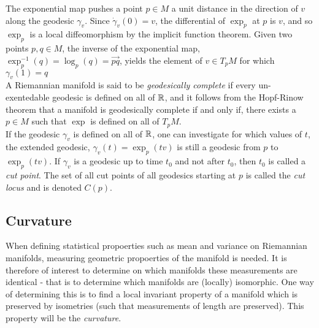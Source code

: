 The exponential map pushes a point $p \in M$ a unit distance in the direction of $v$ along the geodesic $\gamma_v$. Since $\dot{\gamma}_v(0) = v$, the differential of $\exp_p$ at $p$ is $v$, and so $\exp_p$ is a local diffeomorphism by the implicit function theorem. Given two points $p,q \in M$, the inverse of the exponential map, $\exp_p^{-1}(q) = \log_p(q) = \overrightarrow{pq}$, yields the element of $v \in T_p M$ for which $\gamma_v (1) = q$ \\[0.2 cm]
A Riemannian manifold is said to be \textit{geodesically complete} if every un-exentedable geodesic is defined on all of $\mathbb{R}$, and it follows from the Hopf-Rinow theorem that a manifold is geodesically complete if and only if, there exists a $p \in M$ such that $\exp$ is defined on all of $T_p M$.\\[0.2 cm] 
If the geodesic $\gamma_v$ is defined on all of $\mathbb{R}$, one can investigate for which values of $t$, the extended geodesic, $\gamma_v(t) = \exp_p (t v)$ is still a geodesic from $p$ to $\exp_p (t v)$. If $\gamma_v$ is a geodesic up to time $t_0$ and not after $t_0$, then $t_0$ is called a \textit{cut point}. The set of all cut points of all geodesics starting at $p$ is called the \textit{cut locus} and is denoted $C(p)$.

\subsection{Curvature}

When defining statistical propoerties such as mean and variance on Riemannian manifolds, measuring geometric propoerties of the manifold is needed. It is therefore of interest to determine on which manifolds these measurements are identical - that is to determine which manifolds are (locally) isomorphic. One way of determining this is to find a local invariant property of a manifold which is preserved by isometries (such that measurements of length are preserved). This property will be the \textit{curvature}.

